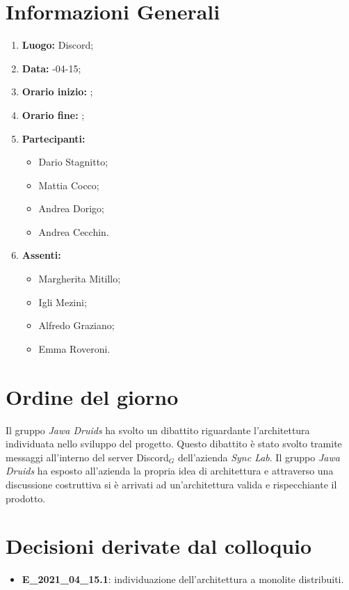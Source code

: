 \newpage
\section{Informazioni Generali}
\begin{enumerate}
	\item \textbf{Luogo:} \normalfont Discord;
	\item \textbf{Data:} -04-15;
	\item \textbf{Orario inizio:} ;
	\item \textbf{Orario fine:} ;
	\item \textbf{Partecipanti:}
	\begin{itemize}
		\item Dario Stagnitto;
		\item Mattia Cocco;
		\item Andrea Dorigo;
		\item Andrea Cecchin.
	\end{itemize}
	\item \textbf{Assenti:}
	\begin{itemize}
		\item Margherita Mitillo;
		\item Igli Mezini;
		\item Alfredo Graziano;
		\item Emma Roveroni.
	\end{itemize}
\end{enumerate}
\section{Ordine del giorno}
Il gruppo \textit{Jawa Druids} ha svolto un dibattito riguardante l'architettura individuata nello sviluppo del progetto. 
Questo dibattito è stato svolto tramite messaggi all'interno del server Discord$_G$ dell'azienda \textit{Sync Lab}.
Il gruppo \textit{Jawa Druids} ha esposto all'azienda la propria idea di architettura e attraverso una discussione costruttiva si è arrivati ad un'architettura valida e rispecchiante il prodotto. 
\section{Decisioni derivate dal colloquio}
\begin{itemize}
	\item \textbf{E\_2021\_04\_15.1}: individuazione dell'architettura a monolite distribuiti.
\end{itemize}